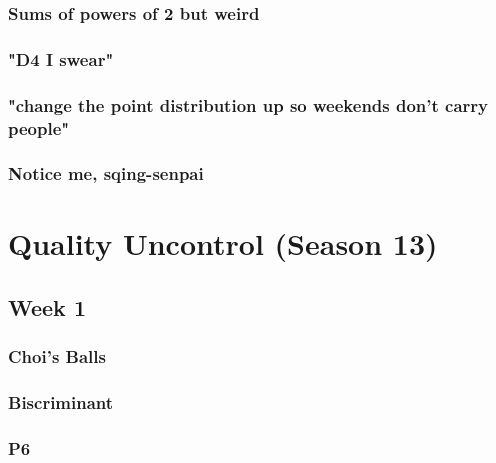 \documentclass[titlepage=true]{scrartcl}
\begin{document}
    \subsubsection{Sums of powers of 2 but weird}
	\label{12.2.4}
	
	\newpage

	\subsubsection{"D4 I swear"}
	\label{12.2.5}
	
	\newpage

    \subsubsection{"change the point distribution up so weekends don't carry people"}
	\label{12.2.6}
	
	\newpage

	\subsubsection{Notice me, sqing-senpai}
	\label{12.2.7}
	
	\newpage

\section{Quality Uncontrol (Season 13)}

    \subsection{Week 1}
        
    \subsubsection{Choi's Balls}
	\label{13.1.1}
	
	\newpage

    \subsubsection{Biscriminant}
	\label{13.1.2}
	
	\newpage
    
    \subsubsection{ P6}
	\label{13.1.3}
	
	\newpage
\end{document}

